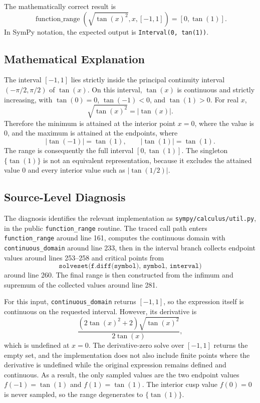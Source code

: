 \documentclass[11pt]{article}
\begin{document}
The mathematically correct result is
\[
  \operatorname{function\_range}\!\left(\sqrt{\tan(x)^2}, x, [-1,1]\right)
  = [0,\tan(1)].
\]
In SymPy notation, the expected output is \texttt{Interval(0, tan(1))}.

\subsection{Mathematical Explanation}

The interval \([-1,1]\) lies strictly inside the principal continuity interval
\((-\pi/2,\pi/2)\) of \(\tan(x)\). On this interval, \(\tan(x)\) is continuous
and strictly increasing, with \(\tan(0)=0\), \(\tan(-1)<0\), and \(\tan(1)>0\).
For real \(x\),
\[
  \sqrt{\tan(x)^2}=|\tan(x)|.
\]
Therefore the minimum is attained at the interior point \(x=0\), where the value
is \(0\), and the maximum is attained at the endpoints, where
\[
  |\tan(-1)| = \tan(1), \qquad |\tan(1)| = \tan(1).
\]
The range is consequently the full interval \([0,\tan(1)]\). The singleton
\(\{\tan(1)\}\) is not an equivalent representation, because it excludes the
attained value \(0\) and every interior value such as \(|\tan(1/2)|\).

\subsection{Source-Level Diagnosis}

The diagnosis identifies the relevant implementation as
\nolinkurl{sympy/calculus/util.py}, in the public \texttt{function\_range}
routine. The traced call path enters \texttt{function\_range} around line 161,
computes the continuous domain with \texttt{continuous\_domain} around line 233,
then in the interval branch collects endpoint values around lines 253--258 and
critical points from
\[
  \texttt{solveset(f.diff(symbol), symbol, interval)}
\]
around line 260. The final range is then constructed from the infimum and
supremum of the collected values around line 281.

For this input, \texttt{continuous\_domain} returns \([-1,1]\), so the
expression itself is continuous on the requested interval. However, its
derivative is
\[
  \frac{(2\tan(x)^2+2)\sqrt{\tan(x)^2}}{2\tan(x)},
\]
which is undefined at \(x=0\). The derivative-zero solve over \([-1,1]\)
returns the empty set, and the implementation does not also include finite
points where the derivative is undefined while the original expression remains
defined and continuous. As a result, the only sampled values are the two endpoint
values \(f(-1)=\tan(1)\) and \(f(1)=\tan(1)\). The interior cusp value
\(f(0)=0\) is never sampled, so the range degenerates to \(\{\tan(1)\}\).
\end{document}
